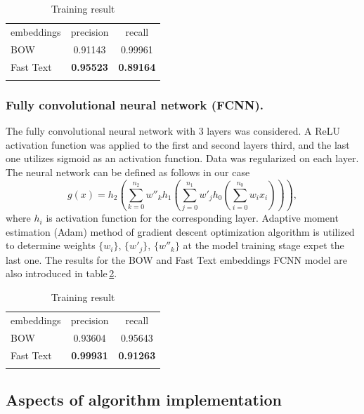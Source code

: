 \documentclass[12pt]{jpconf}
\begin{document}
\begin{table}[h!]
	\centering
	\caption{\label{tbl:01}Training result}
	\begin{center}
		\begin{tabular}{lcc}
			\mr
			embeddings & precision & recall \\
			\mr
			BOW & 0.91143 & 0.99961 \\ \hline
			Fast Text & \bf 0.95523 & \bf 0.89164 \\ 
			\mr
		\end{tabular}
	\end{center}
\end{table}

\subsubsection*{Fully convolutional neural network (FCNN).}

The fully convolutional neural network with 3 layers was considered. A \textsf{ReLU} activation function was applied to the first and second layers third, and the last one utilizes \textsf{sigmoid} as an activation function. Data was regularized on each layer. The neural network can be defined as follows in our case
$$
g(x) = h_2 \left(\sum_{k=0}^{n_2} w''_k h_1\left(\sum_{j=0}^{n_1} w'_j h_0\left( \sum_{i=0}^{n_0} w_i x_i \right)\right)\right),
$$
where $h_i$ is activation function for the corresponding layer. Adaptive moment estimation (Adam) method of gradient descent optimization algorithm is utilized to determine weights $\{w_i\}$, $\{w'_j\}$, $\{w''_k\}$ at the model training stage expet the last one.
The results for the BOW and Fast Text embeddings FCNN model are also introduced in table\,\ref{tbl:02}.

\begin{table}[h!]
	\centering
	\caption{\label{tbl:02}Training result}
	\begin{center}
		\begin{tabular}{lcc}
			\mr
			embeddings & precision & recall \\
			\mr
			BOW & 0.93604 & 0.95643 \\ \hline
			Fast Text & \bf 0.99931 & \bf 0.91263 \\ 
			\mr
		\end{tabular}
	\end{center}
\end{table}


\subsection{Aspects of algorithm implementation}
\end{document}

